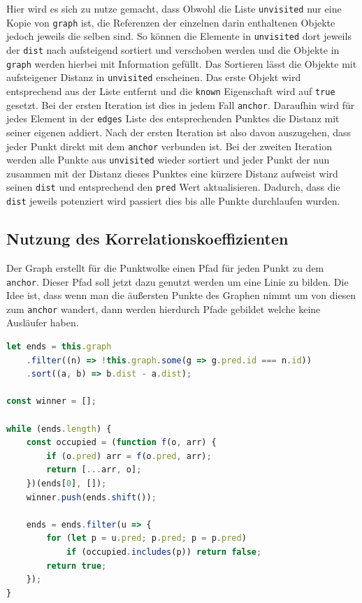 Hier wird es sich zu nutze gemacht, dass Obwohl die Liste \lstinline{unvisited} nur eine Kopie von \lstinline{graph} ist, die Referenzen der einzelnen darin enthaltenen Objekte jedoch jeweils die selben sind.
So können die Elemente in \lstinline{unvisited} dort jeweils der \lstinline{dist} nach aufsteigend sortiert und verschoben werden und die Objekte in \lstinline{graph} werden hierbei mit Information gefüllt.
Das Sortieren lässt die Objekte mit aufsteigener Distanz in \lstinline{unvisited} erscheinen.
Das erste Objekt wird entsprechend aus der Liste entfernt und die \lstinline{known} Eigenschaft wird auf \lstinline{true} gesetzt.
Bei der ersten Iteration ist dies in jedem Fall \lstinline{anchor}.
Daraufhin wird für jedes Element in der \lstinline{edges} Liste des entsprechenden Punktes die Distanz mit seiner eigenen addiert.
Nach der ersten Iteration ist also davon auszugehen, dass jeder Punkt direkt mit dem \lstinline{anchor} verbunden ist.
Bei der zweiten Iteration werden alle Punkte aus \lstinline{unvisited} wieder sortiert und jeder Punkt der nun zusammen mit der Distanz dieses Punktes eine kürzere Distanz aufweist wird seinen \lstinline{dist} und entsprechend den \lstinline{pred} Wert aktualisieren.
Dadurch, dass die \lstinline{dist} jeweils potenziert wird passiert dies bis alle Punkte durchlaufen wurden.

\subsection{Nutzung des Korrelationskoeffizienten}

Der Graph erstellt für die Punktwolke einen Pfad für jeden Punkt zu dem \lstinline{anchor}.
Dieser Pfad soll jetzt dazu genutzt werden um eine Linie zu bilden.
Die Idee ist, dass wenn man die äu{\ss}ersten Punkte des Graphen nimmt um von diesen zum \lstinline{anchor} wandert, dann werden hierdurch Pfade gebildet welche keine Ausläufer haben.

\begin{lstlisting}[language=JavaScript, caption={Bestimmung der äu{\ss}ersten Knoten zur Bestimmung von Geraden durch den Korrelationskoeffizienten in der \lstinline{groupsByCorrelation} Funktion innerhalb der \lstinline{Dijkstra} Klasse.}, label={lst:dijkstra_correlation_part1}]
let ends = this.graph
    .filter((n) => !this.graph.some(g => g.pred.id === n.id))
    .sort((a, b) => b.dist - a.dist);

const winner = [];

while (ends.length) {
    const occupied = (function f(o, arr) {
        if (o.pred) arr = f(o.pred, arr);
        return [...arr, o];
    })(ends[0], []);
    winner.push(ends.shift());

    ends = ends.filter(u => {
        for (let p = u.pred; p.pred; p = p.pred)
            if (occupied.includes(p)) return false;
        return true;
    });
}
\end{lstlisting}

